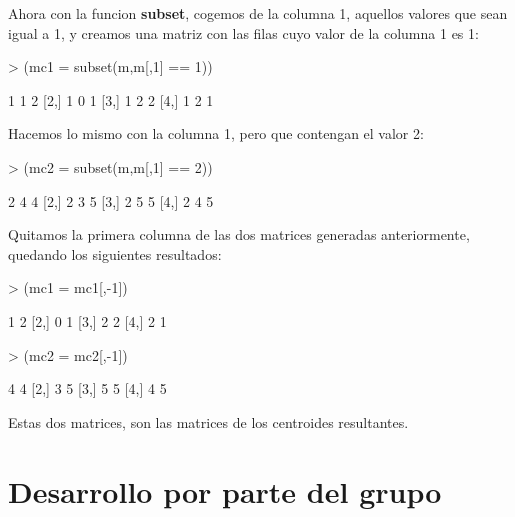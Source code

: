 \documentclass [a4paper] {article}
\begin{document}
Ahora con la funcion \textbf{subset}, cogemos de la columna 1, aquellos valores que sean igual a 1, y creamos 
una matriz con las filas cuyo valor de la columna 1 es 1:

\begin{Schunk}
\begin{Sinput}
> (mc1 = subset(m,m[,1] == 1))
\end{Sinput}
\begin{Soutput}
     [,1] [,2] [,3]
[1,]    1    1    2
[2,]    1    0    1
[3,]    1    2    2
[4,]    1    2    1
\end{Soutput}
\end{Schunk}

Hacemos lo mismo con la columna 1, pero que contengan el valor 2:

\begin{Schunk}
\begin{Sinput}
> (mc2 = subset(m,m[,1] == 2))
\end{Sinput}
\begin{Soutput}
     [,1] [,2] [,3]
[1,]    2    4    4
[2,]    2    3    5
[3,]    2    5    5
[4,]    2    4    5
\end{Soutput}
\end{Schunk}

Quitamos la primera columna de las dos matrices generadas anteriormente, quedando los siguientes resultados:

\begin{Schunk}
\begin{Sinput}
> (mc1 = mc1[,-1])
\end{Sinput}
\begin{Soutput}
     [,1] [,2]
[1,]    1    2
[2,]    0    1
[3,]    2    2
[4,]    2    1
\end{Soutput}
\begin{Sinput}
> (mc2 = mc2[,-1])
\end{Sinput}
\begin{Soutput}
     [,1] [,2]
[1,]    4    4
[2,]    3    5
[3,]    5    5
[4,]    4    5
\end{Soutput}
\end{Schunk}

Estas dos matrices, son las matrices de los centroides resultantes.

\section{Desarrollo por parte del grupo}
\end{document}
